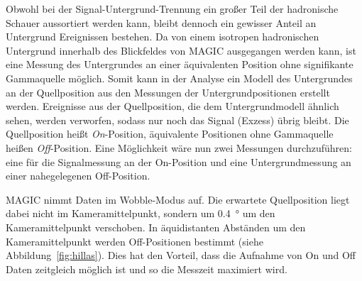 Obwohl bei der Signal-Untergrund-Trennung ein großer Teil der hadronische Schauer aussortiert werden kann, bleibt
dennoch ein gewisser Anteil an Untergrund Ereignissen bestehen.
Da von einem
isotropen hadronischen Untergrund
innerhalb des Blickfeldes von MAGIC
ausgegangen werden kann,
ist eine Messung des Untergrundes an
einer äquivalenten Position ohne signifikante Gammaquelle möglich.
Somit kann
in der Analyse ein Modell des Untergrundes an der Quellposition aus den
Messungen der Untergrundpositionen erstellt werden.
Ereignisse aus der Quellposition,
die dem Untergrundmodell ähnlich sehen, werden verworfen,
sodass nur noch das Signal (Exzess) übrig bleibt.
Die Quellposition heißt \textit{On}-Position, äquivalente Positionen ohne
Gammaquelle heißen \textit{Off}-Position.
Eine Möglichkeit wäre nun zwei Messungen durchzuführen: eine für die
Signalmessung an der On-Position und eine Untergrundmessung an einer
nahegelegenen Off-Position.




MAGIC nimmt Daten im Wobble-Modus auf.
Die erwartete Quellposition liegt dabei nicht im
Kameramittelpunkt,
sondern um
\SI{0.4}{\degree} um den Kameramittelpunkt
verschoben.
In äquidistanten Abständen um den Kameramittelpunkt
werden Off-Positionen bestimmt (siehe Abbildung~\ref{fig:hillas}).
Dies hat den Vorteil, dass die Aufnahme von On und Off Daten zeitgleich möglich
ist und so die Messzeit maximiert wird.


\clearpage
